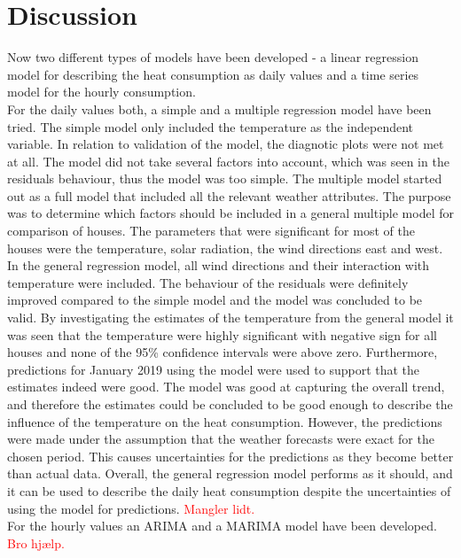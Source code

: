 \chapter{Discussion}
\label{chap: discussion}
Now two different types of models have been developed - a linear regression model for describing the heat consumption as daily values and a time series model for the hourly consumption. \\

\noindent For the daily values both, a simple and a multiple regression model have been tried. The simple model only included the temperature as the independent variable. In relation to validation of the model, the diagnotic plots were not met at all. The model did not take several factors into account, which was seen in the residuals behaviour, thus the model was too simple. The multiple model started out as a full model that included all the relevant weather attributes. The purpose was to determine which factors should be included in a general multiple model for comparison of houses. The parameters that were significant for most of the houses were the temperature, solar radiation, the wind directions east and west. In the general regression model, all wind directions and their interaction with temperature were included. The behaviour of the residuals were definitely improved compared to the simple model and the model was concluded to be valid. By investigating the estimates of the temperature from the general model it was seen that the temperature were highly significant with negative sign for all houses and none of the 95\% confidence intervals were above zero. Furthermore, predictions for January 2019 using the model were used to support that the estimates indeed were good. The model was good at capturing the overall trend, and therefore the estimates could be concluded to be good enough to describe the influence of the temperature on the heat consumption. However, the predictions were made under the assumption that the weather forecasts were exact for the chosen period. This causes uncertainties for the predictions as they become better than actual data. Overall, the general regression model performs as it should, and it can be used to describe the daily heat consumption despite the uncertainties of using the model for predictions. \textcolor{red}{Mangler lidt.} \\

\noindent For the hourly values an ARIMA and a MARIMA model have been developed. \textcolor{red}{Bro hjælp.} \\

